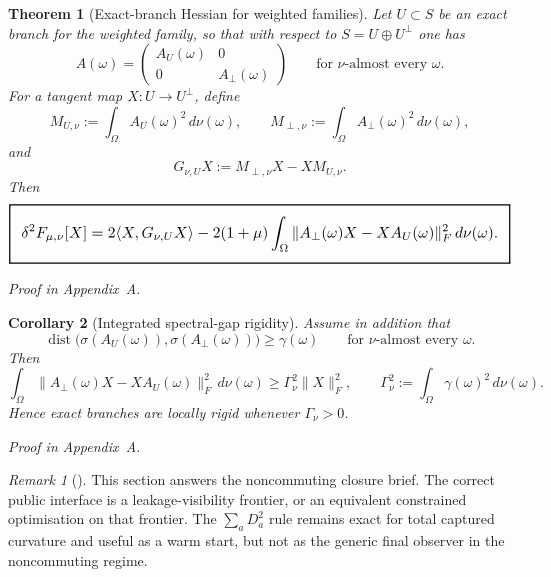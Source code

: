 \documentclass[11pt,a4paper]{article}
\numberwithin{equation}{section}
\DeclareMathOperator{\dist}{dist}
\newcommand{\geomboxed}[1]{%
  \setlength{\fboxsep}{8pt}%
  \setlength{\fboxrule}{0.9pt}%
  \fbox{\scalebox{1.12}{$\displaystyle #1$}}%
}
\theoremstyle{thmcompact}
\newtheorem{theorem}{Theorem}[section]
\newtheorem{corollary}[theorem]{Corollary}
\theoremstyle{remark}
\newtheorem*{remarkplain}{Remark}
\newenvironment{remark}[1][]%
{\begin{remarkbox}\begin{remarkplain}[#1]\normalfont}
{\end{remarkplain}\end{remarkbox}}
\newcommand{\proofappendix}{\par{\hfill\scriptsize\emph{Proof in Appendix~A.}}\par}
\begin{document}
\begin{theorem}[Exact-branch Hessian for weighted families]
\label{thm:weighted-branch-hessian}
Let $U\subset S$ be an exact branch for the weighted family, so that with respect to $S=U\oplus U^\perp$ one has
\begin{equation}
A(\omega)=
\begin{pmatrix}
A_U(\omega) & 0\\
0 & A_\perp(\omega)
\end{pmatrix}
\qquad \text{for } \nu\text{-almost every }\omega.
\end{equation}
For a tangent map $X:U\to U^\perp$, define
\begin{equation}
M_{U,\nu}:=\int_\Omega A_U(\omega)^2\,d\nu(\omega),
\qquad
M_{\perp,\nu}:=\int_\Omega A_\perp(\omega)^2\,d\nu(\omega),
\end{equation}
and
\begin{equation}
G_{\nu,U}X:=M_{\perp,\nu}X-XM_{U,\nu}.
\end{equation}
Then
\begin{equation}
\geomboxed{\delta^2F_{\mu,\nu}[X]
=2\langle X,G_{\nu,U}X\rangle
-2(1+\mu)\int_\Omega \|A_\perp(\omega)X-XA_U(\omega)\|_F^2\,d\nu(\omega).}
\label{eq:weighted-branch-hessian}
\end{equation}
\end{theorem}

\proofappendix

\begin{corollary}[Integrated spectral-gap rigidity]
\label{cor:weighted-rigidity}
Assume in addition that
\begin{equation}
\dist\bigl(\sigma(A_U(\omega)),\sigma(A_\perp(\omega))\bigr)\ge \gamma(\omega)
\qquad \text{for } \nu\text{-almost every }\omega.
\end{equation}
Then
\begin{equation}
\int_\Omega \|A_\perp(\omega)X-XA_U(\omega)\|_F^2\,d\nu(\omega)
\ge
\Gamma_\nu^2\|X\|_F^2,
\qquad
\Gamma_\nu^2:=\int_\Omega \gamma(\omega)^2\,d\nu(\omega).
\end{equation}
Hence exact branches are locally rigid whenever $\Gamma_\nu>0$.
\end{corollary}

\proofappendix

\begin{remark}
This section answers the noncommuting closure brief. The correct public interface is a leakage-visibility frontier, or an equivalent constrained optimisation on that frontier. The $\sum_a D_a^2$ rule remains exact for total captured curvature and useful as a warm start, but not as the generic final observer in the noncommuting regime.
\end{remark}
\end{document}
